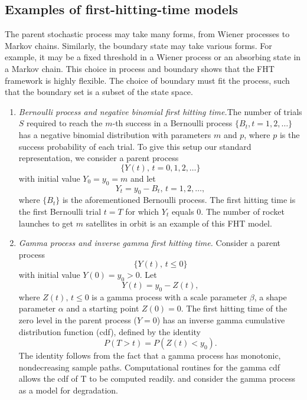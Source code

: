 \subsection{Examples of first-hitting-time models}
The parent stochastic process may take many forms, from Wiener processes to Markov chains. Similarly, the boundary state may take various forms. For example, it may be a fixed threshold in a Wiener process or an absorbing state in a Markov chain. This choice in process and boundary shows that the FHT framework is highly flexible. The choice of boundary must fit the process, such that the boundary set is a subset of the state space.
\begin{enumerate}
    \item \textit{Bernoulli process and negative binomial first hitting time.}The number of trials $S$ required to reach the $m$-th success in a Bernoulli process $\{B_t,t=1,2,\ldots\}$ has a negative binomial distribution with parameters $m$ and $p$, where $p$ is the success probability of each trial. To give this setup our standard representation, we consider a parent process
    \begin{equation*}
        \{Y(t),\,t=0,1,2,\ldots\}
    \end{equation*}
    with initial value $Y_0=y_0=m$ and let
    \begin{equation*}
        Y_t=y_0-B_t,\,t=1,2,\ldots,
    \end{equation*}
    where $\{B_t\}$ is the aforementioned Bernoulli process. The first hitting time is the first Bernoulli trial $t=T$ for which $Y_t$ equals 0. The number of rocket launches to get $m$ satellites in orbit is an example of this FHT model.
    \item \textit{Gamma process and inverse gamma first hitting time.} Consider a parent process
    \begin{equation*}
        \{Y(t),\,t\leq0\}
    \end{equation*}
    with initial value $Y(0)=y_0>0$. Let
    \begin{equation*}
        Y(t)=y_0-Z(t),
    \end{equation*}
    where $Z(t),\,t\leq0$ is a gamma process with a scale parameter $\beta$, a shape parameter $\alpha$ and a starting point $Z(0)=0$. The first hitting time of the zero level in the parent process ($Y=0$) has an inverse gamma cumulative distribution function (cdf), defined by the identity
    \begin{equation}
        P(T>t)=P(Z(t)<y_0).
    \end{equation}
    The identity follows from the fact that a gamma process has monotonic, nondecreasing sample paths. Computational routines for the gamma cdf allows the cdf of T to be computed readily. \citet{singpurwalla1995} and \citet{lawless2004} consider the gamma process as a model for degradation.
\end{enumerate}
